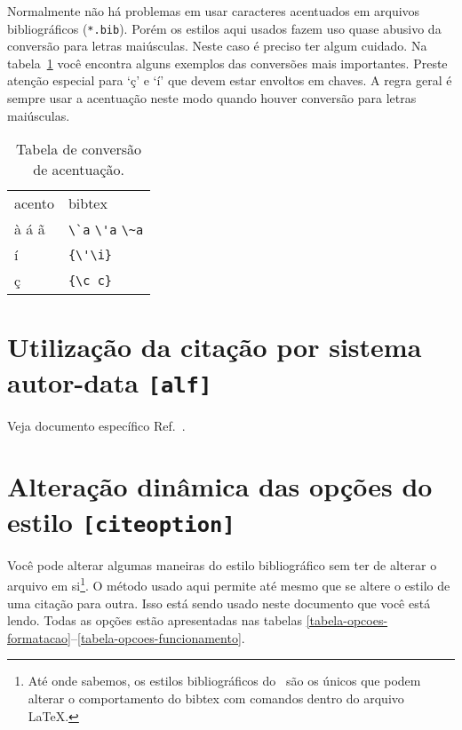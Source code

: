\documentclass[a4paper]{ltxdoc}
\begin{document}
Normalmente não há problemas em usar caracteres acentuados em arquivos
bibliográficos (\texttt{*.bib}). Porém os estilos aqui usados fazem uso quase abusivo da
conversão para letras maiúsculas. Neste caso é preciso ter algum cuidado.
Na tabela~\ref{tabela-acentos} você encontra alguns exemplos das conversões
mais importantes. Preste atenção especial para `ç' e `í' que devem estar
envoltos em chaves. A regra geral é sempre usar a acentuação neste modo quando
houver conversão para letras maiúsculas.

\begin{table}[htbp]
\caption{Tabela de conversão de acentuação.}
\label{tabela-acentos}

\begin{center}
\begin{tabular}{ll}\hline\hline
acento & \textsf{bibtex}\\
à á ã & \verb+\`a+ \verb+\'a+ \verb+\~a+\\
í & \verb+{\'\i}+\\
ç & \verb+{\c c}+\\
\hline\hline
\end{tabular}
\end{center}
\end{table}


\section{Utilização da citação por sistema autor-data {\tt [alf]}}

Veja documento específico Ref.~.

\section{Alteração dinâmica das opções do estilo {\tt [citeoption]}}

\label{chapter-opcoes-estilo}

Você pode alterar algumas maneiras do estilo bibliográfico sem ter de alterar o
arquivo em si\footnote{Até onde sabemos, os estilos bibliográficos do \abnTeX\
são os únicos que podem alterar o comportamento do \textsf{bibtex} com comandos
dentro do arquivo \LaTeX.}. O método usado aqui permite até mesmo que se altere o estilo
de uma citação para outra. Isso está sendo usado neste documento que você está
lendo. Todas as opções estão apresentadas nas tabelas
\ref{tabela-opcoes-formatacao}--\ref{tabela-opcoes-funcionamento}.
\end{document}
